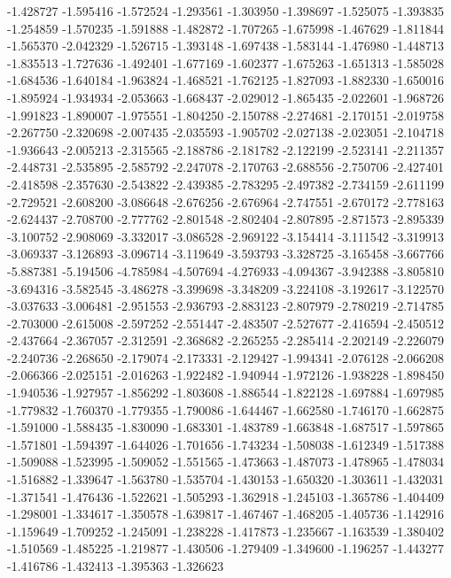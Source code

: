 -1.428727
-1.595416
-1.572524
-1.293561
-1.303950
-1.398697
-1.525075
-1.393835
-1.254859
-1.570235
-1.591888
-1.482872
-1.707265
-1.675998
-1.467629
-1.811844
-1.565370
-2.042329
-1.526715
-1.393148
-1.697438
-1.583144
-1.476980
-1.448713
-1.835513
-1.727636
-1.492401
-1.677169
-1.602377
-1.675263
-1.651313
-1.585028
-1.684536
-1.640184
-1.963824
-1.468521
-1.762125
-1.827093
-1.882330
-1.650016
-1.895924
-1.934934
-2.053663
-1.668437
-2.029012
-1.865435
-2.022601
-1.968726
-1.991823
-1.890007
-1.975551
-1.804250
-2.150788
-2.274681
-2.170151
-2.019758
-2.267750
-2.320698
-2.007435
-2.035593
-1.905702
-2.027138
-2.023051
-2.104718
-1.936643
-2.005213
-2.315565
-2.188786
-2.181782
-2.122199
-2.523141
-2.211357
-2.448731
-2.535895
-2.585792
-2.247078
-2.170763
-2.688556
-2.750706
-2.427401
-2.418598
-2.357630
-2.543822
-2.439385
-2.783295
-2.497382
-2.734159
-2.611199
-2.729521
-2.608200
-3.086648
-2.676256
-2.676964
-2.747551
-2.670172
-2.778163
-2.624437
-2.708700
-2.777762
-2.801548
-2.802404
-2.807895
-2.871573
-2.895339
-3.100752
-2.908069
-3.332017
-3.086528
-2.969122
-3.154414
-3.111542
-3.319913
-3.069337
-3.126893
-3.096714
-3.119649
-3.593793
-3.328725
-3.165458
-3.667766
-5.887381
-5.194506
-4.785984
-4.507694
-4.276933
-4.094367
-3.942388
-3.805810
-3.694316
-3.582545
-3.486278
-3.399698
-3.348209
-3.224108
-3.192617
-3.122570
-3.037633
-3.006481
-2.951553
-2.936793
-2.883123
-2.807979
-2.780219
-2.714785
-2.703000
-2.615008
-2.597252
-2.551447
-2.483507
-2.527677
-2.416594
-2.450512
-2.437664
-2.367057
-2.312591
-2.368682
-2.265255
-2.285414
-2.202149
-2.226079
-2.240736
-2.268650
-2.179074
-2.173331
-2.129427
-1.994341
-2.076128
-2.066208
-2.066366
-2.025151
-2.016263
-1.922482
-1.940944
-1.972126
-1.938228
-1.898450
-1.940536
-1.927957
-1.856292
-1.803608
-1.886544
-1.822128
-1.697884
-1.697985
-1.779832
-1.760370
-1.779355
-1.790086
-1.644467
-1.662580
-1.746170
-1.662875
-1.591000
-1.588435
-1.830090
-1.683301
-1.483789
-1.663848
-1.687517
-1.597865
-1.571801
-1.594397
-1.644026
-1.701656
-1.743234
-1.508038
-1.612349
-1.517388
-1.509088
-1.523995
-1.509052
-1.551565
-1.473663
-1.487073
-1.478965
-1.478034
-1.516882
-1.339647
-1.563780
-1.535704
-1.430153
-1.650320
-1.303611
-1.432031
-1.371541
-1.476436
-1.522621
-1.505293
-1.362918
-1.245103
-1.365786
-1.404409
-1.298001
-1.334617
-1.350578
-1.639817
-1.467467
-1.468205
-1.405736
-1.142916
-1.159649
-1.709252
-1.245091
-1.238228
-1.417873
-1.235667
-1.163539
-1.380402
-1.510569
-1.485225
-1.219877
-1.430506
-1.279409
-1.349600
-1.196257
-1.443277
-1.416786
-1.432413
-1.395363
-1.326623
